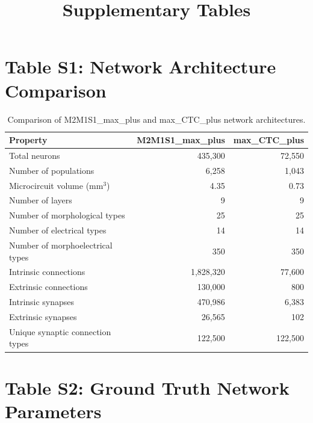 \documentclass[10pt]{article}
\title{Supplementary Tables}
\begin{document}
\maketitle

\section*{Table S1: Network Architecture Comparison}

\begin{table}[h]
\centering
\caption{Comparison of M2M1S1\_max\_plus and max\_CTC\_plus network architectures.}
\begin{tabular}{lrr}
\toprule
\textbf{Property} & \textbf{M2M1S1\_max\_plus} & \textbf{max\_CTC\_plus} \\
\midrule
Total neurons & 435,300 & 72,550 \\
Number of populations & 6,258 & 1,043 \\
Microcircuit volume (mm$^3$) & 4.35 & 0.73 \\
Number of layers & 9 & 9 \\
Number of morphological types & 25 & 25 \\
Number of electrical types & 14 & 14 \\
Number of morphoelectrical types & 350 & 350 \\
Intrinsic connections & 1,828,320 & 77,600 \\
Extrinsic connections & 130,000 & 800 \\
Intrinsic synapses & 470,986 & 6,383 \\
Extrinsic synapses & 26,565 & 102 \\
Unique synaptic connection types & 122,500 & 122,500 \\
\bottomrule
\end{tabular}
\end{table}

\section*{Table S2: Ground Truth Network Parameters}
\end{document}
